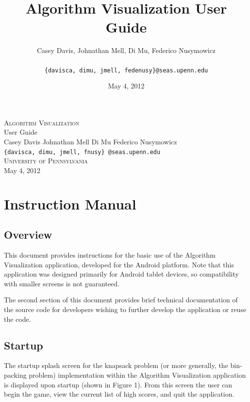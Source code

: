 \documentclass[11pt]{article}
\title{Algorithm Visualization User Guide\\}
\author{Casey Davis, Johnathan Mell, Di Mu, Federico Nusymowicz \\\\
\texttt{\{davisca, dimu, jmell, fedenusy\}@seas.upenn.edu}}
\date{May 4, 2012}
\begin{document}
\begin{titlepage}
\begin{center}
\vspace*{\fill}

\textsc{\Huge Algorithm Visualization}\\[0.75cm]

\huge User Guide\\[1.25cm]

\large Casey Davis \;\;\;\; Johnathan Mell \;\;\;\;   Di Mu \;\;\;\;   Federico
Nusymowicz \\[0.5cm]

\large \texttt{\{davisca, dimu, jmell, fnusy\} @seas.upenn.edu} \\[1.75cm]

\large \textsc{University of Pennsylvania} \\[0.5cm]

\large May 4, 2012

\vspace*{\fill}
\end{center}
\end{titlepage}

\tableofcontents

\newpage

\section{Instruction Manual}

\subsection{Overview}

This document provides instructions for the basic use of the Algorithm
Visualization application, developed for the Android platform.  Note that
this application was designed primarily for Android tablet devices, so
compatibility with smaller screens is not guaranteed.

The second section of this document provides brief technical documentation of
the source code for developers wishing to further develop the application
or reuse the code.

\subsection{Startup}

The startup splash screen for the knapsack problem (or more generally, the
bin-packing problem) implementation within the Algorithm Visualization
application is displayed upon startup (shown in Figure 1).  From this screen
the user can begin the game, view the current list of high scores, and quit
the application.\\
\end{document}
